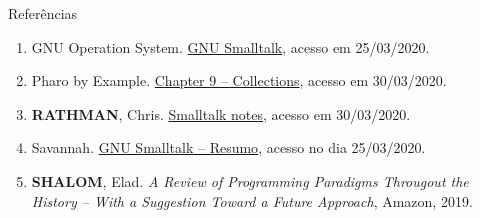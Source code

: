 \begin{frame}[fragile]{Referências}

    \begin{enumerate}
        \item GNU Operation System. \href{https://www.gnu.org/software/smalltalk/}{GNU Smalltalk},
            acesso em 25/03/2020.
 
        \item Pharo by Example. \href{http://pharo.gforge.inria.fr/PBE1/PBE1ch10.html}{Chapter 9 -- Collections}, acesso em 30/03/2020.

        \item \textbf{RATHMAN}, Chris. \href{http://www.angelfire.com/tx4/cus/notes/smalltalk.html}{Smalltalk notes}, acesso em 30/03/2020.
 
        \item Savannah. \href{https://savannah.gnu.org/projects/smalltalk}{GNU Smalltalk -- Resumo},
            acesso no dia 25/03/2020.

        \item \textbf{SHALOM}, Elad. \textit{A Review of Programming Paradigms Througout the 
            History -- With a Suggestion Toward a Future Approach}, Amazon, 2019.
    \end{enumerate}

\end{frame}
